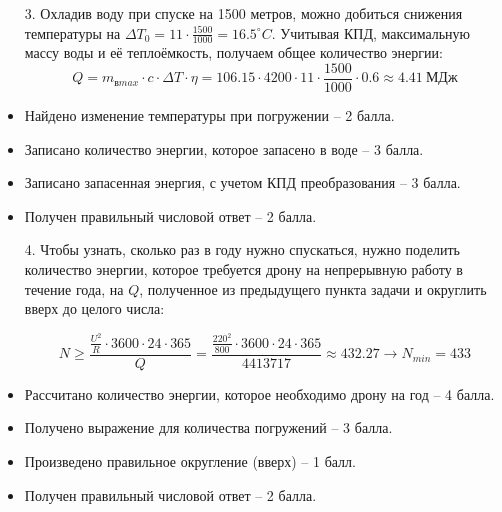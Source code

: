 \begin{enumerate}
    \item[3.] Охладив воду при спуске на 1500 метров, 
    можно добиться снижения температуры на $\Delta T_0=11 \cdot \frac{1500}{1000}=16.5^\circ C$. Учитывая КПД, 
    максимальную массу воды и её теплоёмкость, получаем общее количество энергии:
    $$Q=m_{\text{в}max} \cdot c \cdot \Delta T \cdot \eta =106.15 \cdot 4200 \cdot 11 \cdot \frac{1500}{1000} \cdot 0.6 \approx 4.41 \: \text{МДж}$$
    
\end{enumerate}

\additionalCriteria

\begin{itemize}
    \item Найдено изменение температуры при погружении – 2 балла.
    \item Записано количество энергии, которое запасено в воде – 3 балла.
    \item Записано запасенная энергия, с учетом КПД преобразования – 3 балла.
    \item Получен правильный числовой ответ – 2 балла.
\end{itemize}

\begin{enumerate}
    \item[4.] Чтобы узнать, сколько раз в году нужно спускаться, нужно поделить количество 
    энергии, которое требуется дрону на непрерывную работу 
    в течение года, на $Q$, полученное из предыдущего пункта 
    задачи и округлить вверх до целого числа:

    $$N\geq\frac{\frac{U^2}{R} \cdot 3600 \cdot 24 \cdot 365}{Q}=\frac{\frac{220^2}{800} \cdot 3600 \cdot 24 \cdot 365}{4413717} \approx 432.27 \rightarrow N_{min}=433$$
    
\end{enumerate}

\additionalCriteria

\begin{itemize}
    \item Рассчитано количество энергии, которое необходимо дрону на год – 4 балла.
    \item Получено выражение для количества погружений – 3 балла.
    \item Произведено правильное округление (вверх) – 1 балл.
    \item Получен правильный числовой ответ – 2 балла.
\end{itemize}


